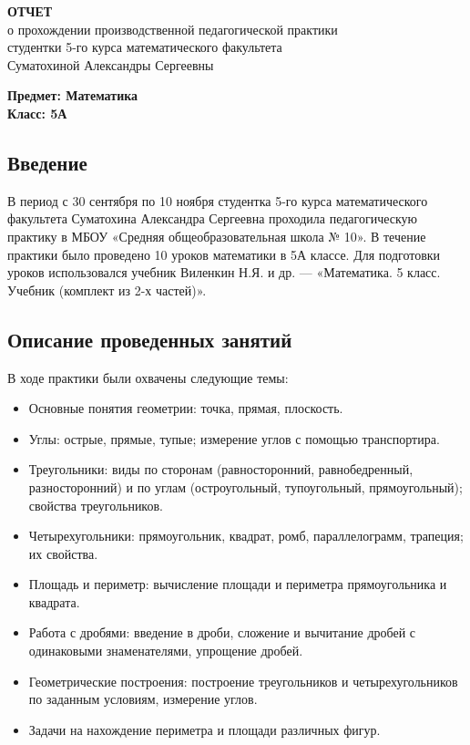 \documentclass[a4paper,12pt]{article}
\begin{document}
\begin{center}
\textbf{ОТЧЕТ}\\
о прохождении производственной педагогической практики\\
студентки 5-го курса математического факультета\\
Суматохиной Александры Сергеевны
\end{center}


\noindent
\textbf{Предмет: Математика}\\
\textbf{Класс: 5А}\\

\subsection*{Введение}

В период с 30 сентября по 10 ноября студентка 5-го курса математического факультета Суматохина Александра Сергеевна проходила педагогическую практику в МБОУ «Средняя общеобразовательная школа № 10». В течение практики было проведено 10 уроков математики в 5А классе. Для подготовки уроков использовался учебник Виленкин Н.Я. и др. — «Математика. 5 класс. Учебник (комплект из 2-х частей)».

\subsection*{Описание проведенных занятий}

В ходе практики были охвачены следующие темы:

\begin{itemize}
    \item Основные понятия геометрии: точка, прямая, плоскость.
    \item Углы: острые, прямые, тупые; измерение углов с помощью транспортира.
    \item Треугольники: виды по сторонам (равносторонний, равнобедренный, разносторонний) и по углам (остроугольный, тупоугольный, прямоугольный); свойства треугольников.
    \item Четырехугольники: прямоугольник, квадрат, ромб, параллелограмм, трапеция; их свойства.
    \item Площадь и периметр: вычисление площади и периметра прямоугольника и квадрата.
    \item Работа с дробями: введение в дроби, сложение и вычитание дробей с одинаковыми знаменателями, упрощение дробей.
    \item Геометрические построения: построение треугольников и четырехугольников по заданным условиям, измерение углов.
    \item Задачи на нахождение периметра и площади различных фигур.
\end{itemize}
\end{document}
